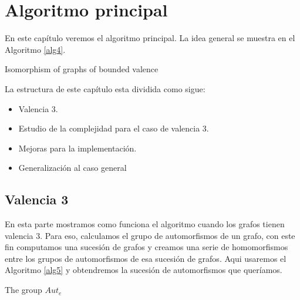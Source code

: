 \documentclass[12pt,a4paper]{book}
\theoremstyle{plain}
\theoremstyle{definition}
\theoremstyle{remark}
\begin{document}
\section*{Algoritmo principal}
En este capítulo veremos el algoritmo principal. La idea general se muestra  en el Algoritmo \ref{alg4}.

\begin{algorithm}\label{alg4}\hypertarget{alg4}{}
\caption{Isomorphism of graphs of bounded valence}

\end{algorithm}

La estructura de este capítulo esta dividida como sigue:
\begin{itemize}
 \item Valencia 3.
 \item Estudio de la complejidad para el caso de valencia 3.
 \item Mejoras para la implementación.
 \item Generalización al caso general
\end{itemize}
\subsection*{Valencia 3}
En esta parte mostramos como funciona el algoritmo cuando los grafos tienen valencia 3. Para eso,   calculamos  el 
grupo de automorfismos de un grafo, con este fin computamos  una sucesión de grafos y creamos una serie de homomorfismos entre 
los grupos de automorfismos de esa sucesión de grafos. Aqui usaremos el Algoritmo \ref{alg5} y obtendremos la sucesión de 
automorfismos que queríamos.

\begin{algorithm}\label{alg5}\hypertarget{alg5}{}
\caption{The group $Aut_e$}

\end{algorithm}
 
\end{document}
